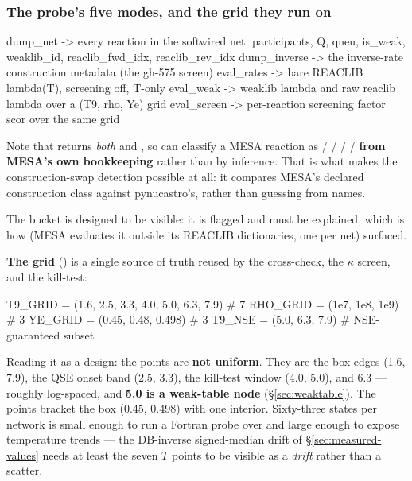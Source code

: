 \subsubsection{The probe's five modes, and the grid they run on}
\label{sec:probe-modes}

\begin{srclisting}
dump_net      -> every reaction in the softwired net: participants, Q, qneu,
                 is_weak, weaklib_id, reaclib_fwd_idx, reaclib_rev_idx
dump_inverse  -> the inverse-rate construction metadata (the gh-575 screen)
eval_rates    -> bare REACLIB lambda(T), screening off, T-only
eval_weak     -> weaklib lambda and raw reaclib lambda over a (T9, rho, Ye) grid
eval_screen   -> per-reaction screening factor scor over the same grid
\end{srclisting}

Note that  returns \emph{both}  and
, so  can classify a MESA
reaction as  /  /  /
 /  \textbf{from MESA's own bookkeeping} rather
than by inference. That is what makes the 
construction-swap detection possible at all: it compares MESA's declared
construction class against pynucastro's, rather than guessing from names.

The  bucket is designed to be visible: it is flagged and must be
explained, which is how  (MESA evaluates it outside its
REACLIB dictionaries, one per net) surfaced.

\textbf{The grid} () is a single source of truth
reused by the cross-check, the $\kappa$ screen, and the kill-test:

\begin{srclisting}
T9_GRID  = (1.6, 2.5, 3.3, 4.0, 5.0, 6.3, 7.9)     # 7
RHO_GRID = (1e7, 1e8, 1e9)                          # 3
YE_GRID  = (0.45, 0.48, 0.498)                      # 3
T9_NSE   = (5.0, 6.3, 7.9)                          # NSE-guaranteed subset
\end{srclisting}

Reading it as a design: the \Tn{} points are \textbf{not uniform}. They are the
box edges (1.6, 7.9), the QSE onset band (2.5, 3.3), the kill-test window
(4.0, 5.0), and 6.3 --- roughly log-spaced, and \textbf{5.0 is a weak-table
node} (\S\ref{sec:weaktable}). The \Ye{} points bracket the box (0.45, 0.498)
with one interior. Sixty-three states per network is small enough to run a
Fortran probe over and large enough to expose temperature trends --- the
DB-inverse signed-median drift of \S\ref{sec:measured-values} needs at least the
seven $T$ points to be visible as a \emph{drift} rather than a scatter.

